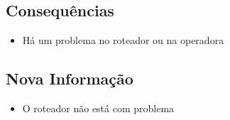\documentclass[10pt,a4paper]{amsart}
\begin{document}
\subsection{Consequências}
\begin{itemize}
 \item Há um problema no roteador ou na operadora
\end{itemize}
\subsection{Nova Informação}
\begin{itemize}
 \item O roteador não está com problema
\end{itemize}
\end{document}
